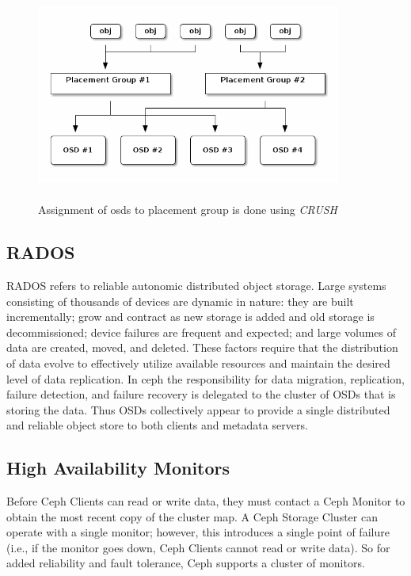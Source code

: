 \documentclass[a4paper,10pt]{article}
\begin{document}
\begin{figure}[!htb]
\centering
\includegraphics[width=10cm,height=7cm]{images/crush}
\caption[Long caption]{Assignment of osds to placement group is done using \emph{CRUSH} }
\end{figure}


\begin{adjustwidth}{1.5em}{0pt}
\subsection{RADOS}
    RADOS\cite{weil2007rados} refers to reliable autonomic distributed object storage. Large systems consisting of thousands of devices are dynamic in nature: they are built incrementally; grow and contract as new storage is added and old storage is decommissioned; device failures are frequent and expected; and large volumes of data are created, moved, and deleted. These factors require that the distribution of data evolve to effectively utilize available resources and maintain the desired level of data replication. In ceph the  responsibility for data migration, replication, failure detection, and failure recovery is delegated to the cluster of OSDs that is storing the data. Thus OSDs collectively appear to provide a single distributed and reliable object store to both clients and metadata servers.

\end{adjustwidth}

\begin{adjustwidth}{1.5em}{0pt}
\subsection{\small{High Availability Monitors}}
    Before Ceph Clients can read or write data, they must contact a Ceph Monitor to obtain the most recent copy of the cluster map. A Ceph Storage Cluster can operate with a single monitor; however, this introduces a single point of failure (i.e., if the monitor goes down, Ceph Clients cannot read or write data). So for added reliability and fault tolerance, Ceph supports a cluster of monitors. 
\end{adjustwidth}
\end{document}
